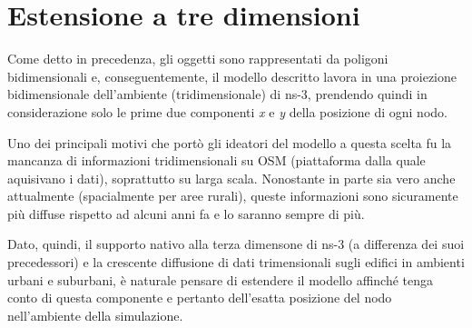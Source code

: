 \section{Estensione a tre dimensioni}\label{sec:estensione-a-tre-dimensioni}
Come detto in precedenza, gli oggetti sono rappresentati da poligoni bidimensionali e, conseguentemente,
il modello descritto lavora in una proiezione bidimensionale dell'ambiente (tridimensionale) di ns-3,
prendendo quindi in considerazione solo le prime due componenti \textit{x} e \textit{y} della posizione di ogni nodo.

Uno dei principali motivi che portò gli ideatori del modello a questa scelta fu la mancanza di informazioni tridimensionali
su OSM (piattaforma dalla quale aquisivano i dati), soprattutto su larga scala.
Nonostante in parte sia vero anche attualmente (spacialmente per aree rurali), queste informazioni sono sicuramente
più diffuse rispetto ad alcuni anni fa e lo saranno sempre di più.

Dato, quindi, il supporto nativo alla terza dimensone di ns-3 (a differenza dei suoi precedessori) e la crescente diffusione
di dati trimensionali sugli edifici in ambienti urbani e suburbani, è naturale pensare di estendere il modello affinché
tenga conto di questa componente e pertanto dell'esatta posizione del nodo nell'ambiente della simulazione.
%
